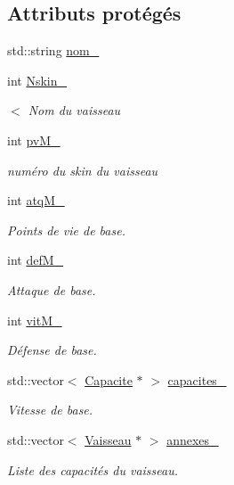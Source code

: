 \subsection*{Attributs protégés}
\begin{DoxyCompactItemize}
\item 
std\+::string \hyperlink{class_vaisseau_a2abb8ab70479bc486d19b563dddbe825}{nom\+\_\+}
\item 
int \hyperlink{class_vaisseau_af6b149a2f49de284503d5e3f80e2735a}{Nskin\+\_\+}
\begin{DoxyCompactList}\small\item\em $<$ Nom du vaisseau \end{DoxyCompactList}\item 
int \hyperlink{class_vaisseau_ac8b21f62b8c41f90864b1bca81d685de}{pv\+M\+\_\+}
\begin{DoxyCompactList}\small\item\em numéro du skin du vaisseau \end{DoxyCompactList}\item 
int \hyperlink{class_vaisseau_a24d3d623d4f470aa1a11222c3872b2ec}{atq\+M\+\_\+}
\begin{DoxyCompactList}\small\item\em Points de vie de base. \end{DoxyCompactList}\item 
int \hyperlink{class_vaisseau_ad62e88bb7527f72a6a446d9bbb219744}{def\+M\+\_\+}
\begin{DoxyCompactList}\small\item\em Attaque de base. \end{DoxyCompactList}\item 
int \hyperlink{class_vaisseau_a7cf3915f4d4044ee28fd5e5633fce11c}{vit\+M\+\_\+}
\begin{DoxyCompactList}\small\item\em Défense de base. \end{DoxyCompactList}\item 
std\+::vector$<$ \hyperlink{class_capacite}{Capacite} $\ast$ $>$ \hyperlink{class_vaisseau_a5db47e079dc15db1158bd0a549f22908}{capacites\+\_\+}
\begin{DoxyCompactList}\small\item\em Vitesse de base. \end{DoxyCompactList}\item 
std\+::vector$<$ \hyperlink{class_vaisseau}{Vaisseau} $\ast$ $>$ \hyperlink{class_vaisseau_a077c826bea6ce9f63de811762fbe8784}{annexes\+\_\+}
\begin{DoxyCompactList}\small\item\em Liste des capacités du vaisseau. \end{DoxyCompactList}\item 

\end{DoxyCompactItemize}
